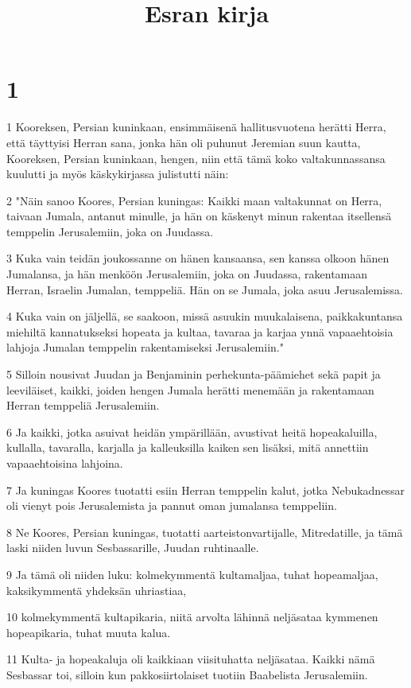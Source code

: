 

\title{Esran kirja}


\chapter{1}

\par 1 Kooreksen, Persian kuninkaan, ensimmäisenä hallitusvuotena herätti Herra, että täyttyisi Herran sana, jonka hän oli puhunut Jeremian suun kautta, Kooreksen, Persian kuninkaan, hengen, niin että tämä koko valtakunnassansa kuulutti ja myös käskykirjassa julistutti näin:
\par 2 "Näin sanoo Koores, Persian kuningas: Kaikki maan valtakunnat on Herra, taivaan Jumala, antanut minulle, ja hän on käskenyt minun rakentaa itsellensä temppelin Jerusalemiin, joka on Juudassa.
\par 3 Kuka vain teidän joukossanne on hänen kansaansa, sen kanssa olkoon hänen Jumalansa, ja hän menköön Jerusalemiin, joka on Juudassa, rakentamaan Herran, Israelin Jumalan, temppeliä. Hän on se Jumala, joka asuu Jerusalemissa.
\par 4 Kuka vain on jäljellä, se saakoon, missä asuukin muukalaisena, paikkakuntansa miehiltä kannatukseksi hopeata ja kultaa, tavaraa ja karjaa ynnä vapaaehtoisia lahjoja Jumalan temppelin rakentamiseksi Jerusalemiin."
\par 5 Silloin nousivat Juudan ja Benjaminin perhekunta-päämiehet sekä papit ja leeviläiset, kaikki, joiden hengen Jumala herätti menemään ja rakentamaan Herran temppeliä Jerusalemiin.
\par 6 Ja kaikki, jotka asuivat heidän ympärillään, avustivat heitä hopeakaluilla, kullalla, tavaralla, karjalla ja kalleuksilla kaiken sen lisäksi, mitä annettiin vapaaehtoisina lahjoina.
\par 7 Ja kuningas Koores tuotatti esiin Herran temppelin kalut, jotka Nebukadnessar oli vienyt pois Jerusalemista ja pannut oman jumalansa temppeliin.
\par 8 Ne Koores, Persian kuningas, tuotatti aarteistonvartijalle, Mitredatille, ja tämä laski niiden luvun Sesbassarille, Juudan ruhtinaalle.
\par 9 Ja tämä oli niiden luku: kolmekymmentä kultamaljaa, tuhat hopeamaljaa, kaksikymmentä yhdeksän uhriastiaa,
\par 10 kolmekymmentä kultapikaria, niitä arvolta lähinnä neljäsataa kymmenen hopeapikaria, tuhat muuta kalua.
\par 11 Kulta- ja hopeakaluja oli kaikkiaan viisituhatta neljäsataa. Kaikki nämä Sesbassar toi, silloin kun pakkosiirtolaiset tuotiin Baabelista Jerusalemiin.


